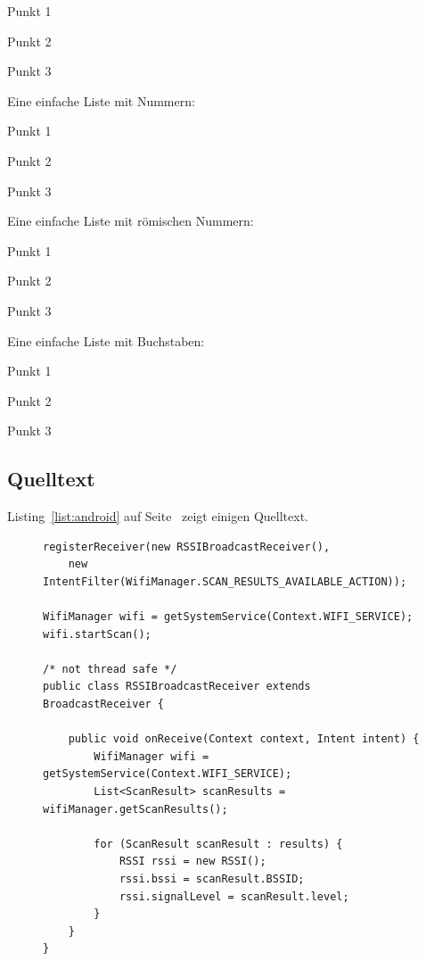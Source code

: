 \begin{compactitem}
	\item Punkt 1
	\item Punkt 2
	\item Punkt 3
\end{compactitem}

Eine einfache Liste mit Nummern:
\begin{compactenum}
	\item Punkt 1
	\item Punkt 2 
	\item Punkt 3
\end{compactenum}

Eine einfache Liste mit römischen Nummern:
\begin{compactenum}[I.]
	\item Punkt 1
	\item Punkt 2
	\item Punkt 3
\end{compactenum}

Eine einfache Liste mit Buchstaben:
\begin{compactenum}[(a)]
	\item Punkt 1
	\item Punkt 2 
	\item Punkt 3
\end{compactenum}

\subsection{Quelltext}

Listing~\ref{list:android} auf Seite~\pageref{list:android} zeigt einigen Quelltext.

\begin{figure}[bht]
\begin{lstlisting}[caption=Scanning for Wi-Fi Access Points on Android, label=list:android]
registerReceiver(new RSSIBroadcastReceiver(), 
    new IntentFilter(WifiManager.SCAN_RESULTS_AVAILABLE_ACTION));

WifiManager wifi = getSystemService(Context.WIFI_SERVICE);
wifi.startScan();

/* not thread safe */
public class RSSIBroadcastReceiver extends BroadcastReceiver {

    public void onReceive(Context context, Intent intent) {
        WifiManager wifi = getSystemService(Context.WIFI_SERVICE);
        List<ScanResult> scanResults = wifiManager.getScanResults();

        for (ScanResult scanResult : results) {
            RSSI rssi = new RSSI();
            rssi.bssi = scanResult.BSSID;
            rssi.signalLevel = scanResult.level;
        }
    }
}
\end{lstlisting}
\end{figure}